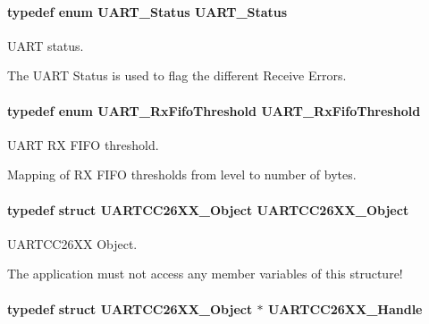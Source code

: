 \paragraph[{U\-A\-R\-T\-\_\-\-Status}]{\setlength{\rightskip}{0pt plus 5cm}typedef enum {\bf U\-A\-R\-T\-\_\-\-Status}  {\bf U\-A\-R\-T\-\_\-\-Status}}\label{_u_a_r_t_c_c26_x_x_8h_a27818b82da9cf35d1f0f228b1f69b036}


U\-A\-R\-T status. 

The U\-A\-R\-T Status is used to flag the different Receive Errors. 
\paragraph[{U\-A\-R\-T\-\_\-\-Rx\-Fifo\-Threshold}]{\setlength{\rightskip}{0pt plus 5cm}typedef enum {\bf U\-A\-R\-T\-\_\-\-Rx\-Fifo\-Threshold}  {\bf U\-A\-R\-T\-\_\-\-Rx\-Fifo\-Threshold}}\label{_u_a_r_t_c_c26_x_x_8h_a95c4e8ad93163c7af4c519b0fbd2dffe}


U\-A\-R\-T R\-X F\-I\-F\-O threshold. 

Mapping of R\-X F\-I\-F\-O thresholds from level to number of bytes. 
\paragraph[{U\-A\-R\-T\-C\-C26\-X\-X\-\_\-\-Object}]{\setlength{\rightskip}{0pt plus 5cm}typedef struct {\bf U\-A\-R\-T\-C\-C26\-X\-X\-\_\-\-Object}  {\bf U\-A\-R\-T\-C\-C26\-X\-X\-\_\-\-Object}}\label{_u_a_r_t_c_c26_x_x_8h_a41437180bc6a286da889dc2aae1c001c}


U\-A\-R\-T\-C\-C26\-X\-X Object. 

The application must not access any member variables of this structure! 
\paragraph[{U\-A\-R\-T\-C\-C26\-X\-X\-\_\-\-Handle}]{\setlength{\rightskip}{0pt plus 5cm}typedef struct {\bf U\-A\-R\-T\-C\-C26\-X\-X\-\_\-\-Object} $\ast$ {\bf U\-A\-R\-T\-C\-C26\-X\-X\-\_\-\-Handle}}\label{_u_a_r_t_c_c26_x_x_8h_a276d493f1689ad8c16b5cfb4dada194a}


